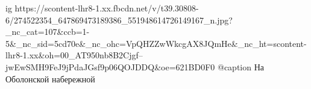  
 
 
 
 


\ifcmt
     ig https://scontent-lhr8-1.xx.fbcdn.net/v/t39.30808-6/274522354_647869473189386_551948614726149167_n.jpg?_nc_cat=107&ccb=1-5&_nc_sid=5cd70e&_nc_ohc=VpQHZZwWkcgAX8JQmHe&_nc_ht=scontent-lhr8-1.xx&oh=00_AT950nb8B2Cjgf--jwEwSMH9FeJ9jPdaJGsf9p06QOJDDQ&oe=621BD0F0
		 @caption На Оболонской набережной
\fi
